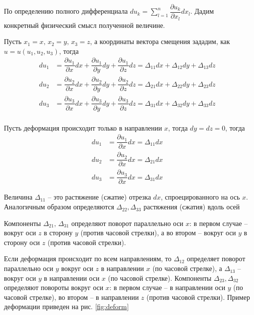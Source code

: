 \documentclass[12pt,a4paper]{article}
\begin{document}
    По определению полного дифференциала $du_k = \displaystyle \sum_{l = 1}^{n} \dfrac{\partial u_k}{\partial x_l} dx_l$. Дадим конкретный физический смысл полученной величине.  

    \newpage

    Пусть $ x_1 = x,\, x_2 = y,\, x_3 = z $, а координаты вектора смещения зададим, как $ u = u(u_1, u_2, u_3)$, тогда 
    \[
      \begin{split}
        du_1 &= \dfrac{\partial u_1}{\partial x}dx + \dfrac{\partial u_1}{\partial y}dy + \dfrac{\partial u_1}{\partial z}dz = \Delta_{11}dx + \Delta_{12}dy + \Delta_{13}dz  \\[0.7em]
        du_2 &= \dfrac{\partial u_2}{\partial x}dx + \dfrac{\partial u_2}{\partial y}dy + \dfrac{\partial u_2}{\partial z}dz = \Delta_{21}dx + \Delta_{22}dy + \Delta_{23}dz\\[0.7em]
        du_3 &= \dfrac{\partial u_3}{\partial x}dx + \dfrac{\partial u_3}{\partial y}dy + \dfrac{\partial u_3}{\partial z}dz = \Delta_{31}dx + \Delta_{32}dy + \Delta_{33}dz \\
      \end{split}
    \]

    Пусть деформация происходит только в направлении $x$, тогда $dy = dz = 0$, тогда 
    \[
      \begin{split}
        du_1 &= \dfrac{\partial u_1}{\partial x}dx = \Delta_{11}dx \\[0.7em]
        du_2 &= \dfrac{\partial u_2}{\partial x}dx = \Delta_{21}dx \\[0.7em]
        du_3 &= \dfrac{\partial u_3}{\partial x}dx = \Delta_{31}dx
      \end{split}
    \]
    
    Величина $ \Delta_{11} $ -- это растяжение (сжатие) отрезка $dx$, спроецированного на ось $x$. Аналогичным образом определяются $\Delta_{22}, \Delta_{33}$ растяжения (сжатия) вдоль осей 

    Компоненты $\Delta_{21},\, \Delta_{31}$ определяют поворот параллельно оси $x$: в первом случае -- вокруг оси $z$ в сторону $y$ (против часовой стрелки), а во втором -- вокруг оси $y$ в сторону оси $z$ (против часовой стрелки). 
    
    Если деформация происходит по всем направлениям, то $\Delta_{12}$ определяет поворот параллельно оси $y$ вокруг оси $z$ в направлении $x$ (по часовой стрелке), а $ \Delta_{13} $ -- вокруг оси $y$ в направлении оси $x$ (по часовой стрелке). Компоненты $\Delta_{23}, \Delta_{32}$ определяют повороты вокруг оси $x$: в первом случае -- в направлении оси $y$ (по часовой стрелке), во втором -- в направлении $z$ (против часовой стрелки). Пример деформации приведен на рис. \ref{fig:deform}
\end{document}
